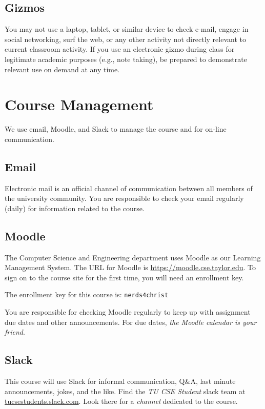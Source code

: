 \subsection{Gizmos}

You may not use a laptop, tablet, or similar device to check e-mail, engage in social
networking, surf the web, or any other activity not directly relevant
to current classroom activity.
If you use an electronic gizmo during class for legitimate academic purposes
(e.g., note taking), be prepared to demonstrate relevant use on demand
at any time.

\section{Course Management}

We use email, Moodle, and Slack to manage the course
and for on-line communication.

\subsection{Email}

Electronic mail is an official channel of communication
between all members of the university community.
You are responsible to check your email regularly
(daily)
for information related to the course.

\subsection{Moodle}

The Computer Science and Engineering department uses Moodle
as our Learning Management System.
The URL for Moodle is \url{https://moodle.cse.taylor.edu}.
To sign on to the course site for the first time,
you will need an enrollment key.
\begin{framed}
The enrollment key for this course is:
\texttt{nerds4christ}
\end{framed}
You are responsible for checking Moodle regularly
to keep up with assignment due dates and other announcements.
For due dates, \emph{the Moodle calendar is your friend}.

\subsection{Slack}

This course will use Slack
for informal communication,
Q\&A,
last minute announcements,
jokes,
and the like.
Find the \emph{TU CSE Student} slack team at
\url{tucsestudents.slack.com}.
Look there for a \emph{channel}
dedicated to the course.


